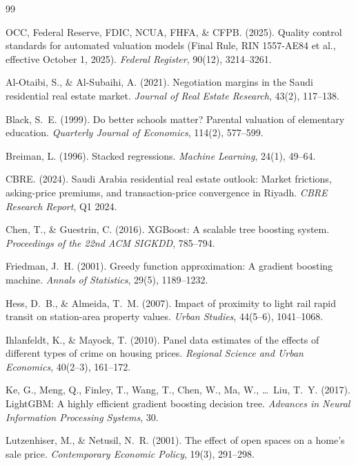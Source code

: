 \documentclass[11pt, a4paper, twoside]{article}
\begin{document}

\begin{thebibliography}{99}

OCC, Federal Reserve, FDIC, NCUA, FHFA, \& CFPB. (2025).
Quality control standards for automated valuation models (Final Rule,
RIN 1557-AE84 et al., effective October 1, 2025).
\textit{Federal Register}, 90(12), 3214--3261.

Al-Otaibi, S., \& Al-Subaihi, A. (2021).
Negotiation margins in the Saudi residential real estate market.
\textit{Journal of Real Estate Research}, 43(2), 117--138.

Black, S.~E. (1999).
Do better schools matter? Parental valuation of elementary education.
\textit{Quarterly Journal of Economics}, 114(2), 577--599.

Breiman, L. (1996).
Stacked regressions.
\textit{Machine Learning}, 24(1), 49--64.

CBRE. (2024).
Saudi Arabia residential real estate outlook: Market frictions, asking-price
premiums, and transaction-price convergence in Riyadh.
\textit{CBRE Research Report}, Q1 2024.

Chen, T., \& Guestrin, C. (2016).
XGBoost: A scalable tree boosting system.
\textit{Proceedings of the 22nd ACM SIGKDD}, 785--794.

Friedman, J.~H. (2001).
Greedy function approximation: A gradient boosting machine.
\textit{Annals of Statistics}, 29(5), 1189--1232.

Hess, D.~B., \& Almeida, T.~M. (2007).
Impact of proximity to light rail rapid transit on station-area property values.
\textit{Urban Studies}, 44(5--6), 1041--1068.

Ihlanfeldt, K., \& Mayock, T. (2010).
Panel data estimates of the effects of different types of crime on housing prices.
\textit{Regional Science and Urban Economics}, 40(2--3), 161--172.

Ke, G., Meng, Q., Finley, T., Wang, T., Chen, W., Ma, W., \ldots~Liu, T.~Y. (2017).
LightGBM: A highly efficient gradient boosting decision tree.
\textit{Advances in Neural Information Processing Systems}, 30.

Lutzenhiser, M., \& Netusil, N.~R. (2001).
The effect of open spaces on a home's sale price.
\textit{Contemporary Economic Policy}, 19(3), 291--298.


\end{thebibliography}
\end{document}
